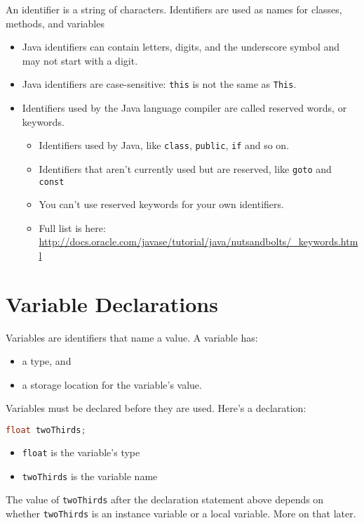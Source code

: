 \documentclass{article}
\begin{document}
An identifier is a string of characters.  Identifiers are used as names for classes, methods, and variables
\begin{itemize}
\item Java identifiers can contain letters, digits, and the underscore symbol and may not start with a digit.
\item Java identifiers are case-sensitive:  {\tt this} is not the same as {\tt This}.
\item Identifiers used by the Java language compiler are called reserved words, or keywords.
\begin{itemize}
\item Identifiers used by Java, like {\tt class}, {\tt public}, {\tt if} and so on.
\item Identifiers that aren't currently used but are reserved, like {\tt goto} and {\tt const}
\item You can't use reserved keywords for your own identifiers.
\item Full list is here: \url{http://docs.oracle.com/javase/tutorial/java/nutsandbolts/_keywords.html}
\end{itemize}

\end{itemize}





\section{Variable Declarations}


Variables are identifiers that name a value. A variable has:
\begin{itemize}
\item a type, and
\item a storage location for the variable's value.
\end{itemize}

Variables must be declared before they are used.  Here's a declaration:
\begin{lstlisting}[language=Java]
float twoThirds;
\end{lstlisting}
\begin{itemize}
\item {\tt float} is the variable's type
\item {\tt twoThirds} is the variable name
\end{itemize}
The value of {\tt twoThirds} after the declaration statement above depends on whether {\tt twoThirds} is an instance variable or a local variable.  More on that later.
\end{document}
